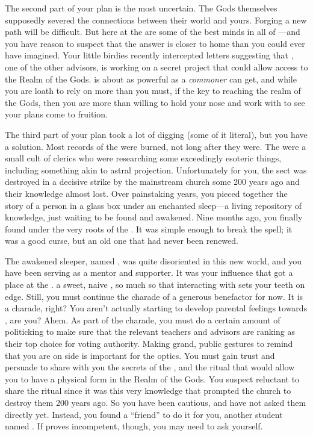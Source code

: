 \documentclass[char]{GL2020}
\begin{document}
The second part of your plan is the most uncertain. The Gods themselves supposedly severed the connections between their world and yours. Forging a new path will be difficult. But here at the \pSc{} are some of the best minds in all of \pEarth{}---and you have reason to suspect that the answer is closer to home than you could ever have imagined. Your little birdies recently intercepted letters suggesting that \cCurse{\full}, one of the other \pFarm{} advisors, is working on a secret project that could allow access to the Realm of the Gods. \cCurse{} is about as powerful as a \emph{commoner} can get, and while you are loath to rely on \cCurse{\them} more than you must, if \cCurse{\they} \cCurse{\have} the key to reaching the realm of the Gods, then you are more than willing to hold your nose and work with \cCurse{\them} to see your plans come to fruition. 

The third part of your plan took a lot of digging (some of it literal), but you have a solution. Most records of the \cDisneySect{} were burned, not long after they were. The \cDisneySect{} were a small cult of \cFarmGod{} clerics who were researching some exceedingly esoteric things, including something akin to astral projection. Unfortunately for you, the sect was destroyed in a decisive strike by the mainstream church some 200 years ago and their knowledge almost lost. Over painstaking years, you pieced together the story of a person in a glass box under an enchanted sleep---a living repository of knowledge, just waiting to be found and awakened. Nine months ago, you finally found \cDisney{\them} under the very roots of the \pSpine{}. It was simple enough to break the spell; it was a good curse, but an old one that had never been renewed. 

The awakened sleeper, named \cDisney{\full}, was quite disoriented in this new world, and you have been serving as a mentor and supporter. It was your influence that got \cDisney{} a place at the \pSchool{}. \cDisney{\They} \cDisney{\are} a sweet, naive \cDisney{\child}, so much so that interacting with \cDisney{\them} sets your teeth on edge. Still, you must continue the charade of a generous benefactor for now. It is a charade, right? You aren’t actually starting to develop parental feelings towards \cDisney{}, are you? Ahem. As part of the charade, you must do a certain amount of politicking to make sure that the relevant teachers and advisors are ranking \cDisney{} as their top choice for voting authority. Making grand, public gestures to remind \cDisney{} that you are on \cDisney{\their} side is important for the optics. You must gain \cDisney{\their} trust and persuade \cDisney{\them} to share with you the secrets of the \cDisneySect{}, and the ritual that would allow you to have a physical form in the Realm of the Gods. You suspect \cDisney{\theyare} reluctant to share the ritual since it was this very knowledge that prompted the church to destroy them 200 years ago. So you have been cautious, and have not asked them directly yet. Instead, you found \cDisney{\them} a ``friend'' to do it for you, another student named \cPirateChild{\full}. If \cPirateChild{} proves incompetent, though, you may need to ask \cDisney{} yourself.
\end{document}
